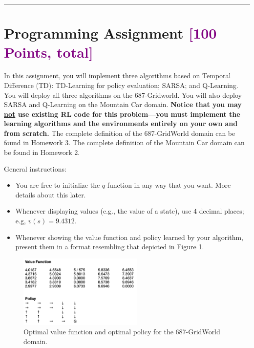 \documentclass{article}
\newcommand{\POINTS}[1]{\textcolor{purple}{\textbf{{#1}}}}
\begin{document}
\noindent\rule{\textwidth}{1pt}

\vspace{0.2cm}
\section*{Programming Assignment \POINTS{[100 Points, total]}}

In this assignment, you will implement three algorithms based on Temporal Difference (TD): TD-Learning for policy evaluation; SARSA; and Q-Learning. You will deploy all three algorithms on the 687-Gridworld. You will also deploy SARSA and Q-Learning on the Mountain Car domain. \textbf{Notice that you may \ul{not} use existing RL code for this problem---you must implement the learning algorithms and the environments entirely on your own and from scratch.} The complete definition of the 687-GridWorld domain can be found in Homework 3. The complete definition of the Mountain Car domain can be found in Homework 2.

\vspace{0.15in}
General instructions:


\begin{itemize}
    \item You are free to initialize the $q$-function in any way that you want. More details about this later. 
    \item Whenever displaying values (e.g., the value of a state), use 4 decimal places; e.g, $v(s)=9.4312$.
    \item Whenever showing the value function and policy learned by your algorithm, present them in a format resembling that depicted in Figure \ref{fig:v_pi_star}.
\end{itemize}

\begin{figure}[!ht]
    \centering
    \includegraphics[width=0.55\textwidth]{HW_figs/v_pi_star_gridworld.png}
    \caption{Optimal value function and optimal policy for the 687-GridWorld domain.}
    \label{fig:v_pi_star}
\end{figure}
\end{document}
